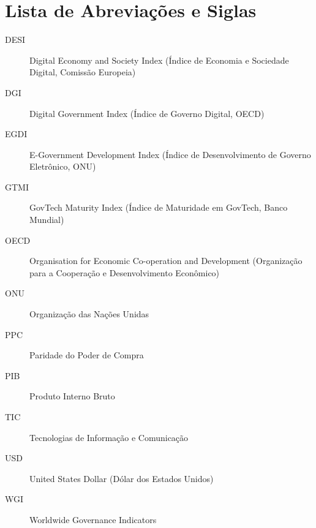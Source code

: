 \chapter*{Lista de Abreviações e Siglas}

\begin{description}
    \item[DESI] Digital Economy and Society Index (Índice de Economia e Sociedade Digital, Comissão Europeia)
    \item[DGI] Digital Government Index (Índice de Governo Digital, OECD)
    \item[EGDI] E-Government Development Index (Índice de Desenvolvimento de Governo Eletrônico, ONU)
    \item[GTMI] GovTech Maturity Index (Índice de Maturidade em GovTech, Banco Mundial)
    \item[OECD] Organisation for Economic Co-operation and Development (Organização para a Cooperação e Desenvolvimento Econômico)
    \item[ONU] Organização das Nações Unidas
    \item[PPC] Paridade do Poder de Compra
    \item[PIB] Produto Interno Bruto
    \item[TIC] Tecnologias de Informação e Comunicação
    \item[USD] United States Dollar (Dólar dos Estados Unidos)
    \item[WGI] Worldwide Governance Indicators
\end{description}